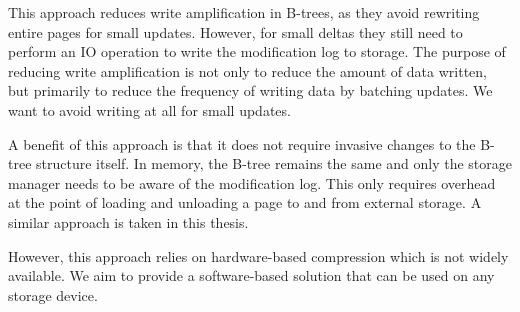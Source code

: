 This approach reduces write amplification in B-trees, as they avoid rewriting entire pages for small updates.
However, for small deltas they still need to perform an \ac{IO} operation to write the modification log to storage.
The purpose of reducing write amplification is not only to reduce the amount of data written, but primarily to reduce the frequency of writing data by batching updates.
We want to avoid writing at all for small updates.

A benefit of this approach is that it does not require invasive changes to the B-tree structure itself.
In memory, the B-tree remains the same and only the storage manager needs to be aware of the modification log.
This only requires overhead at the point of loading and unloading a page to and from external storage.
A similar approach is taken in this thesis.

However, this approach relies on hardware-based compression which is not widely available.
We aim to provide a software-based solution that can be used on any storage device.

    